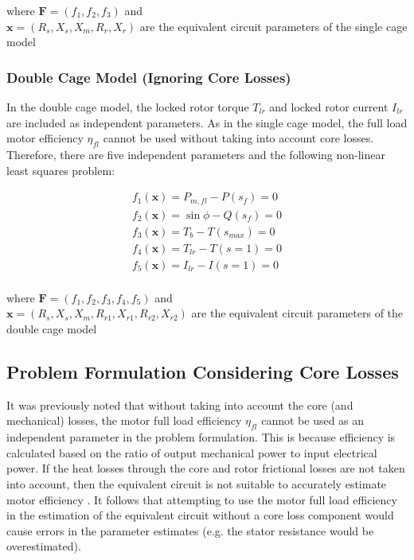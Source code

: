 \documentclass{article}
\begin{document}
\noindent where $\mathbf{F} = ( f_1, f_2, f_3 )$ and \\ 
\indent $\mathbf{x} = ( R_s, X_s, X_m, R_{r}, X_{r} )$ are the equivalent circuit parameters of the single cage model

\subsubsection{Double Cage Model (Ignoring Core Losses)}
In the double cage model, the locked rotor torque $T_{lr}$ and locked rotor current $I_{lr}$ are included as independent parameters. As in the single cage model, the full load motor efficiency $\eta_{fl}$ cannot be used without taking into account core losses. Therefore, there are five independent parameters and the following non-linear least squares problem:

\begin{eqnarray}
f_{1} (\mathbf x) = P_{m,fl} - P(s_{f}) = 0 \\
f_{2} (\mathbf x) = \sin{\phi} - Q(s_{f})  = 0 \\
f_{3} (\mathbf x) = T_{b} - T(s_{max}) = 0 \\
f_{4} (\mathbf x) = T_{lr} - T(s=1) = 0 \\
f_{5} (\mathbf x) = I_{lr} - I(s=1) = 0 \\
\end{eqnarray}

\noindent where $\mathbf{F} = ( f_1, f_2, f_3, f_4, f_5 )$ and \\ 
\indent $\mathbf{x} = ( R_s, X_s, X_m, R_{r1}, X_{r1}, R_{r2}, X_{r2} )$ are the equivalent circuit parameters of the double cage model

\subsection{Problem Formulation Considering Core Losses}
\label{formulation_core_losses}

It was previously noted that without taking into account the core (and mechanical) losses, the motor full load efficiency $\eta_{fl}$ cannot be used as an independent parameter in the problem formulation. This is because efficiency is calculated based on the ratio of output mechanical power to input electrical power. If the heat losses through the core and rotor frictional losses are not taken into account, then the equivalent circuit is not suitable to accurately estimate motor efficiency \cite{haque_2008}. It follows that attempting to use the motor full load efficiency in the estimation of the equivalent circuit without a core loss component would cause errors in the parameter estimates (e.g. the stator resistance would be overestimated). 
\end{document}
